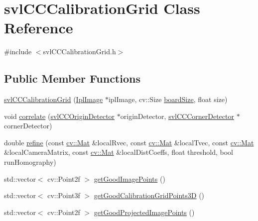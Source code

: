\hypertarget{classsvl_c_c_calibration_grid}{}\section{svl\+C\+C\+Calibration\+Grid Class Reference}
\label{classsvl_c_c_calibration_grid}


{\ttfamily \#include $<$svl\+C\+C\+Calibration\+Grid.\+h$>$}

\subsection*{Public Member Functions}
\begin{DoxyCompactItemize}
\item 
\hyperlink{classsvl_c_c_calibration_grid_a30f35f3fa081d9aef26ddd14ea7768a4}{svl\+C\+C\+Calibration\+Grid} (\hyperlink{svl_types_8h_aa5a40a13021ba9708bfe921e18fdfa53}{Ipl\+Image} $\ast$ipl\+Image, cv\+::\+Size \hyperlink{classsvl_c_c_calibration_grid_a0c584283648c8d63a0c33646d35a60f2}{board\+Size}, float size)
\item 
void \hyperlink{classsvl_c_c_calibration_grid_a751a80c36e0d1d094a41cb8204b0658e}{correlate} (\hyperlink{classsvl_c_c_origin_detector}{svl\+C\+C\+Origin\+Detector} $\ast$origin\+Detector, \hyperlink{classsvl_c_c_corner_detector}{svl\+C\+C\+Corner\+Detector} $\ast$corner\+Detector)
\item 
double \hyperlink{classsvl_c_c_calibration_grid_a4f0a7daef69595eed5cf2b23eb94132f}{refine} (const \hyperlink{namespacecv_a60d81b54f4914bec4cc4a72ab77eb444}{cv\+::\+Mat} \&local\+Rvec, const \hyperlink{namespacecv_a60d81b54f4914bec4cc4a72ab77eb444}{cv\+::\+Mat} \&local\+Tvec, const \hyperlink{namespacecv_a60d81b54f4914bec4cc4a72ab77eb444}{cv\+::\+Mat} \&local\+Camera\+Matrix, const \hyperlink{namespacecv_a60d81b54f4914bec4cc4a72ab77eb444}{cv\+::\+Mat} \&local\+Dist\+Coeffs, float threshold, bool run\+Homography)
\item 
std\+::vector$<$ cv\+::\+Point2f $>$ \hyperlink{classsvl_c_c_calibration_grid_a752883125648639e89eb05d66d19a5d4}{get\+Good\+Image\+Points} ()
\item 
std\+::vector$<$ cv\+::\+Point3f $>$ \hyperlink{classsvl_c_c_calibration_grid_a32c98cacf6d5961cfce2cef58fa03586}{get\+Good\+Calibration\+Grid\+Points3\+D} ()
\item 
std\+::vector$<$ cv\+::\+Point2f $>$ \hyperlink{classsvl_c_c_calibration_grid_aeea914d2140f4cbb5064272ce3d82ab0}{get\+Good\+Projected\+Image\+Points} ()

\end{DoxyCompactItemize}
